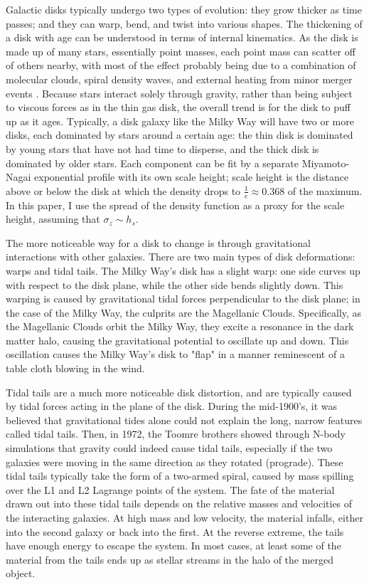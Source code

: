 \documentclass[iop]{emulateapj}
\begin{document}
Galactic disks typically undergo two types of evolution: they grow thicker as time passes; and they can warp, bend, and twist into various shapes. The thickening of a disk with age can be understood in terms of internal kinematics. As the disk is made up of many stars, essentially point masses, each point mass can scatter off of others nearby, with most of the effect probably being due to a combination of molecular clouds, spiral density waves, and external heating from minor merger events \citep{Mer00}. Because stars interact solely through gravity, rather than being subject to viscous forces as in the thin gas disk, the overall trend is for the disk to puff up as it ages. Typically, a disk galaxy like the Milky Way will have two or more disks, each dominated by stars around a certain age: the thin disk is dominated by young stars that have not had time to disperse, and the thick disk is dominated by older stars. Each component can be fit by a separate Miyamoto-Nagai exponential profile with its own scale height; scale height is the distance above or below the disk at which the density drops to $\frac{1}{e} \approx 0.368$ of the maximum. In this paper, I use the spread of the density function as a proxy for the scale height, assuming that $\sigma_z \sim h_s$.

The more noticeable way for a disk to change is through gravitational interactions with other galaxies. There are two main types of disk deformations: warps and tidal tails. The Milky Way's disk has a slight warp: one side curves up with respect to the disk plane, while the other side bends slightly down. This warping is caused by gravitational tidal forces perpendicular to the disk plane; in the case of the Milky Way, the culprits are the Magellanic Clouds. Specifically, as the Magellanic Clouds orbit the Milky Way, they excite a resonance in the dark matter halo, causing the gravitational potential to oscillate up and down. This oscillation causes the Milky Way's disk to "flap" in a manner reminescent of a table cloth blowing in the wind.

Tidal tails are a much more noticeable disk distortion, and are typically caused by tidal forces acting in the plane of the disk. During the mid-1900's, it was believed that gravitational tides alone could not explain the long, narrow features called tidal tails. Then, in 1972, the Toomre brothers \citep{Too72} showed through N-body simulations that gravity could indeed cause tidal tails, especially if the two galaxies were moving in the same direction as they rotated (prograde). These tidal tails typically take the form of a two-armed spiral, caused by mass spilling over the L1 and L2 Lagrange points of the system. The fate of the material drawn out into these tidal tails depends on the relative masses and velocities of the interacting galaxies. At high mass and low velocity, the material infalls, either into the second galaxy or back into the first. At the reverse extreme, the tails have enough energy to escape the system. In most cases, at least some of the material from the tails ends up as stellar streams in the halo of the merged object.
\end{document}
